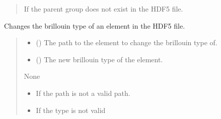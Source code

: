 \documentclass[letterpaper,10pt,english]{sphinxmanual}
\begin{document}
\begin{fulllineitems}
\begin{fulllineitems}
\begin{quote}
\begin{description}
\begin{itemize}
\end{itemize}

\sphinxAtStartPar
{} \textendash{} If the parent group does not exist in the HDF5 file.

\end{description}\end{quote}

\end{fulllineitems}


\begin{fulllineitems}
\label{\detokenize{_autosummary/HDF5_BLS.wrapper:HDF5_BLS.wrapper.Wrapper.change_brillouin_type}}
\pysigstartsignatures
\pysiglinewithargsret
{}
{\sphinxparamcomma {}}
{}
\pysigstopsignatures
\sphinxAtStartPar
Changes the brillouin type of an element in the HDF5 file.
\begin{quote}\begin{description}
\begin{itemize}
\item {} 
\sphinxAtStartPar
{} () \textendash{} The path to the element to change the brillouin type of.

\item {} 
\sphinxAtStartPar
{} () \textendash{} The new brillouin type of the element.

\end{itemize}

\sphinxAtStartPar
None

\begin{itemize}
\item {} 
\sphinxAtStartPar
{} \textendash{} If the path is not a valid path.

\item {} 
\sphinxAtStartPar
{} \textendash{} If the type is not valid


\end{itemize}
\end{description}
\end{quote}
\end{fulllineitems}
\end{fulllineitems}
\end{document}
